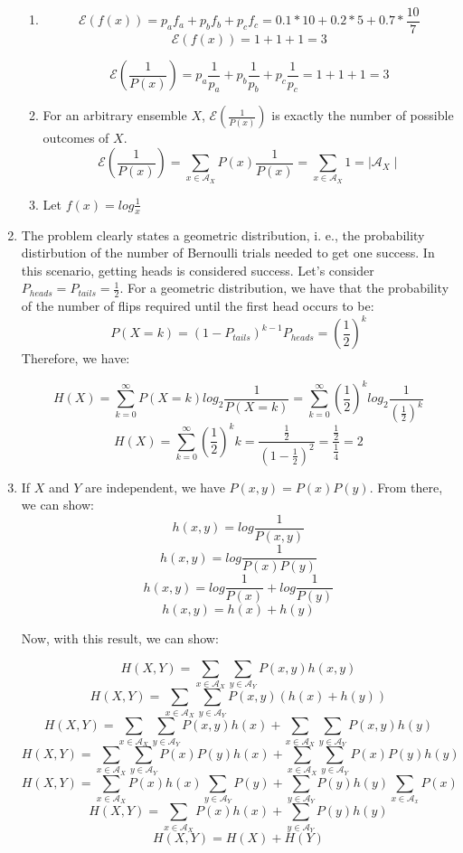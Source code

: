\documentclass{article}
\begin{document}
\begin{enumerate}
\begin{enumerate}
		      \item
		            \[\mathcal{E}(f(x)) = p_a f_a + p_b f_b + p_c f_c = 0.1 * 10 + 0.2 * 5 + 0.7 * \frac{10}{7}\]
		            \[\mathcal{E}(f(x)) = 1 + 1 + 1 = 3\]

		            \[\mathcal{E}(\frac{1}{P(x)}) = p_a \frac{1}{p_a} + p_b \frac{1}{p_b} + p_c \frac{1}{p_c} = 1 + 1 + 1 = 3\]

		      \item For an arbitrary ensemble \(X\), \(\mathcal{E}(\frac{1}{P(x)})\) is exactly the number of possible outcomes of \(X\).
		            \[\mathcal{E}(\frac{1}{P(x)}) = \sum_{x \in \mathcal{A}_X} P(x) \frac{1}{P(x)} = \sum_{x \in \mathcal{A}_X} 1 = \mid\mathcal{A}_X\mid\]

		      \item Let \(f(x) = log \frac{1}{x}\)
	      \end{enumerate}

	\item The problem clearly states a geometric distribution, i. e., the probability distirbution of the number of Bernoulli trials needed to get one success. In this scenario, getting heads is considered success. Let's consider \(P_{heads} = P_{tails} = \frac{1}{2}\). For a geometric distribution, we have that the probability of the number of flips required until the first head occurs to be:
	      \[P(X = k) = (1 - P_{tails})^{k-1} P_{heads} = (\frac{1}{2})^k\]
	      Therefore, we have:

	      \[H(X) = \sum_{k=0}^{\infty} P(X = k) log_2 \frac{1}{P(X = k)} = \sum_{k=0}^{\infty} (\frac{1}{2})^k log_2 \frac{1}{(\frac{1}{2})^k}\]
	      \[H(X) = \sum_{k=0}^{\infty} (\frac{1}{2})^k k = \frac{\frac{1}{2}}{(1 - \frac{1}{2})^2} = \frac{\frac{1}{2}}{\frac{1}{4}} = 2\]

	\item If \(X\) and \(Y\) are independent, we have \(P(x, y) = P(x)P(y)\). From there, we can show:
	      \[h(x, y) = log \frac{1}{P(x, y)}\]
	      \[h(x, y) = log \frac{1}{P(x)P(y)}\]
	      \[h(x, y) = log \frac{1}{P(x)} + log \frac{1}{P(y)}\]
	      \[h(x, y) = h(x) + h(y)\]

	      Now, with this result, we can show:

	      \[H(X, Y) = \sum_{x \in \mathcal{A}_X} \sum_{y \in \mathcal{A}_Y} P(x, y)h(x, y)\]
	      \[H(X, Y) = \sum_{x \in \mathcal{A}_X} \sum_{y \in \mathcal{A}_Y} P(x, y)(h(x) + h(y))\]
	      \[H(X, Y) = \sum_{x \in \mathcal{A}_X} \sum_{y \in \mathcal{A}_Y} P(x, y)h(x) + \sum_{x \in \mathcal{A}_X} \sum_{y \in \mathcal{A}_Y} P(x, y)h(y)\]
	      \[H(X, Y) = \sum_{x \in \mathcal{A}_X} \sum_{y \in \mathcal{A}_Y} P(x)P(y)h(x) + \sum_{x \in \mathcal{A}_X} \sum_{y \in \mathcal{A}_Y} P(x)P(y)h(y)\]
	      \[H(X, Y) = \sum_{x \in \mathcal{A}_X} P(x)h(x) \sum_{y \in \mathcal{A}_Y} P(y) + \sum_{y \in \mathcal{A}_Y} P(y)h(y) \sum_{x \in \mathcal{A}_x} P(x)\]
	      \[H(X, Y) = \sum_{x \in \mathcal{A}_X} P(x)h(x) + \sum_{y \in \mathcal{A}_Y} P(y)h(y) \]
	      \[H(X, Y) = H(X) + H(Y)\]


\end{enumerate}
\end{document}
